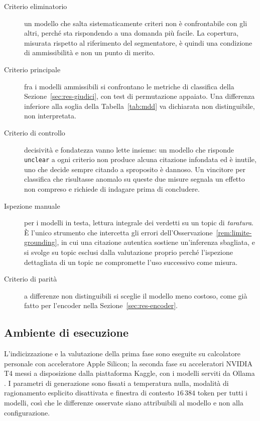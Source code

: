 \documentclass[pdflatex,sn-mathphys-num]{sn-jnl}
\theoremstyle{thmstyleone}
\theoremstyle{thmstyletwo}
\theoremstyle{thmstylethree}
\begin{document}
\begin{description}
  \item[Criterio eliminatorio] un modello che salta sistematicamente criteri non
    è confrontabile con gli altri, perché sta rispondendo a una domanda più
    facile. La copertura, misurata rispetto al riferimento del segmentatore, è
    quindi una condizione di ammissibilità e non un punto di merito.
  \item[Criterio principale] fra i modelli ammissibili si confrontano le metriche
    di classifica della Sezione~\ref{sec:res-giudici}, con test di permutazione
    appaiato. Una differenza inferiore alla soglia della Tabella~\ref{tab:mdd}
    va dichiarata non distinguibile, non interpretata.
  \item[Criterio di controllo] decisività e fondatezza vanno lette insieme: un
    modello che risponde \texttt{unclear} a ogni criterio non produce alcuna
    citazione infondata ed è inutile, uno che decide sempre citando a sproposito
    è dannoso. Un vincitore per classifica che risultasse anomalo su queste due
    misure segnala un effetto non compreso e richiede di indagare prima di
    concludere.
  \item[Ispezione manuale] per i modelli in testa, lettura integrale dei verdetti
    su un topic di \emph{taratura}. È l'unico strumento che intercetta gli errori
    dell'Osservazione~\ref{rem:limite-grounding}, in cui una citazione autentica
    sostiene un'inferenza sbagliata, e si svolge su topic esclusi dalla
    valutazione proprio perché l'ispezione dettagliata di un topic ne compromette
    l'uso successivo come misura.
  \item[Criterio di parità] a differenze non distinguibili si sceglie il modello
    meno costoso, come già fatto per l'encoder nella Sezione~\ref{sec:res-encoder}.
\end{description}

\subsection{Ambiente di esecuzione}\label{sec:ambiente}

L'indicizzazione e la valutazione della prima fase sono eseguite su calcolatore personale con acceleratore Apple Silicon; la seconda fase su acceleratori NVIDIA T4 messi a disposizione dalla piattaforma Kaggle, con i modelli serviti da Ollama \cite{ollama}. I parametri di generazione sono fissati a temperatura nulla, modalità di ragionamento esplicito disattivata e finestra di contesto $16\,384$ token per tutti i modelli, così che le differenze osservate siano attribuibili al modello e non alla configurazione.
\end{document}
